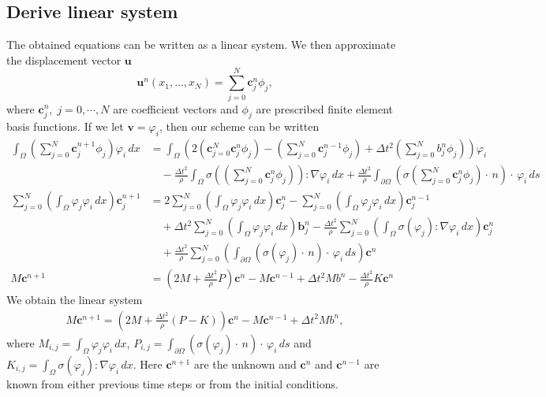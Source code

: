 \documentclass[twoside]{article}
\begin{document}
\subsection{Derive linear system}
The obtained equations can be written as a linear system. We then approximate the displacement vector \( \mathbf{u}\) 
\[ \mathbf{\mathbf{u}}^n(x_1, \dots, x_N) = \sum_{j = 0}^{N}\mathbf{c}_j^n \phi_j, \]
where \( \mathbf{c}_j^n, \; j = 0, \cdots, N\) are coefficient vectors and \( \phi_j\) are prescribed finite element basis functions.
If we let \( \mathbf{v} = \varphi_i\), then our scheme can be written 
\begin{align*}
	\int_{\Omega} \left(\sum_{j = 0}^{N}\mathbf{c}_j^{n+1} \phi_j\right) \varphi_i \, dx 
		&= \int_{\Omega} \left( 2\left(\mathbf{c}_{j = 0}^{N}\mathbf{c}_j^n \phi_j\right) - \left(\sum_{j = 0}^{N}\mathbf{c}_j^{n-1} \phi_j\right) 
		+ \Delta t^2 \left(\sum_{j = 0}^{N}b_j^n \phi_j\right) \right)  \varphi_i  \\
		&\quad-  \frac{\Delta t^2}{\rho}  \int_{\Omega}\sigma\left(\left(\sum_{j = 0}^{N}\mathbf{c}_j^n \phi_j\right)\right) : \nabla \varphi_i \,  dx 
		+ \frac{\Delta t^2}{\rho}  \int_{\partial \Omega} \left(\sigma\left(\sum_{j = 0}^{N}\mathbf{c}_j^n \phi_j\right) \cdot \,n\right) \cdot \, \varphi_i \, ds\\
	\sum_{j = 0}^{N} \left( \int_{\Omega} \varphi_j \varphi_i \, dx \right) \mathbf{c}_j^{n+1} 
			&=  2\sum_{j = 0}^{N} \left( \int_{\Omega} \varphi_j \varphi_i \, dx \right) \mathbf{c}_j^{n}
			- \sum_{j = 0}^{N} \left( \int_{\Omega} \varphi_j \varphi_i \, dx \right) \mathbf{c}_j^{n-1} \\
			&\quad+ \Delta t^2 \sum_{j = 0}^{N} \left( \int_{\Omega} \varphi_j \varphi_i \, dx \right) \mathbf{b}_j^{n} 
			- \frac{\Delta t^2}{\rho}\sum_{j = 0}^{N} \left( \int_{\Omega} \sigma(\varphi_j): \nabla \varphi_i \, dx \right) \mathbf{c}_j^{n} \\
			&\quad+ \frac{\Delta t^2}{\rho} \sum_{j = 0}^{N} \left( \int_{\partial \Omega} (\sigma(\varphi_j) \cdot \,n) \cdot \, \varphi_i \, ds \right) \mathbf{c}^n\\
	M \mathbf{c}^{n+1} &= \left(2 M + \frac{\Delta t^2}{\rho}P\right) \mathbf{c}^n - M \mathbf{c}^{n-1} + \Delta t^2 M b^n - \frac{\Delta t^2}{\rho} K \mathbf{c}^n
\end{align*}
We obtain the linear system 
\begin{align}
	M\mathbf{c}^{n+1} = \left(2M + \frac{\Delta t^2}{\rho}(P-K)\right) \mathbf{c}^n - M\mathbf{c}^{n-1} + \Delta t^2 Mb^n,
\end{align}
where \( M_{i, j} = \int_{\Omega} \varphi_j \varphi_i \, dx \), \( P_{i, j} = \int_{\partial \Omega} (\sigma(\varphi_j) \cdot \,n) \cdot \, \varphi_i \, ds\) and \( K_{i,j} = \int_{\Omega} \sigma(\varphi_j): \nabla \varphi_i \, dx \). Here \( \mathbf{c}^{n+1}\) are the unknown and \( \mathbf{c}^n\) and \( \mathbf{c}^{n-1}\) are known from either previous time steps or from the initial conditions.
\end{document}
